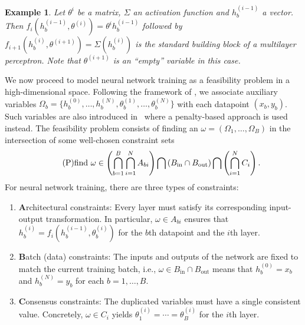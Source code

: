 \documentclass{article}
\newtheorem{example}{Example}
\begin{document}
\begin{example}
    Let $\theta^i$ be a matrix, $\Sigma$ an activation function and $h_b^{(i-1)}$ a vector. Then $f_i(h^{(i-1)}_b, \theta^{(i)}) = \theta^i h^{(i-1)}_b$ followed by $f_{i+1}(h^{(i)}_b, \theta^{(i+1)}) = \Sigma(h^{(i)}_b)$ is the standard building block of a multilayer perceptron. Note that $\theta^{(i+1)}$ is an ``empty'' variable in this case.
\end{example}
We now proceed to model neural network training as a feasibility problem in a high-dimensional space. Following the framework of \cite{elser2019learning, bergmeister2025projection}, we associate auxiliary variables $\Omega_b =\{h^{(0)}_b, \ldots, h^{(N)}_b, \theta^{(1)}_b, \ldots, \theta_b^{(N)}\}$ with each datapoint $(x_b, y_b)$. Such variables are also introduced in~\cite{carreira2014distributed} where a penalty-based approach is used instead. The feasibility problem consists of finding an $\omega = (\Omega_1, \ldots, \Omega_B)$ in the intersection of some well-chosen constraint sets
\begin{equation} \label{eq:feasibility} \tag{P}
    \textnormal{find } \omega \in \left(\bigcap_{b=1}^B\bigcap_{i=1}^N A_{bi}\right) \bigcap \left(B_{\mathrm{in}} \cap B_{\mathrm{out}}\right) \bigcap \left(\bigcap_{i=1}^N C_i\right).
\end{equation}
For neural network training, there are three types of constraints:
\begin{enumerate}[leftmargin=2em]
    \item \textbf{A}rchitectural constraints: Every layer must satisfy its corresponding input-output transformation. In particular, $\omega \in A_{bi}$ ensures that $h_b^{(i)} = f_i(h_b^{(i-1)}, \theta_b^{(i)})$ for the $b$th datapoint and the $i$th layer.
    \item \textbf{B}atch (data) constraints: The inputs and outputs of the network are fixed to match the current training batch, i.e., $\omega \in B_{\mathrm{in}} \cap B_{\mathrm{out}}$ means that $h_b^{(0)} = x_b$ and $h_b^{(N)} = y_b$ for each $b=1,\ldots,B$.
    \item \textbf{C}onsensus constraints: The duplicated variables must have a single consistent value. Concretely, $\omega \in C_i$ yields $\theta_1^{(i)} = \cdots = \theta_B^{(i)}$ for the $i$th layer. 
\end{enumerate}
\end{document}
